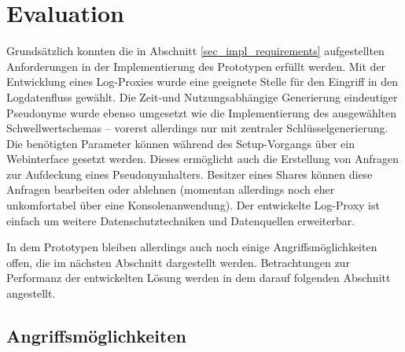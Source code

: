 \section{Evaluation}

\label{sec_impl_evaluation}


Grundsätzlich konnten die in Abschnitt \ref{sec_impl_requirements} aufgestellten Anforderungen in der Implementierung des Prototypen erfüllt werden. Mit der Entwicklung eines Log-Proxies wurde eine geeignete Stelle für den Eingriff in den Logdatenfluss gewählt. Die Zeit-und Nutzungsabhängige Generierung eindeutiger Pseudonyme wurde ebenso umgesetzt wie die Implementierung des ausgewählten Schwellwertschemas -- vorerst allerdings nur mit zentraler Schlüsselgenerierung. Die benötigten Parameter können während des Setup-Vorgangs über ein Webinterface gesetzt werden. Dieses ermöglicht auch die Erstellung von Anfragen zur Aufdeckung eines Pseudonymhalters. Besitzer eines Shares können diese Anfragen bearbeiten oder ablehnen (momentan allerdings noch eher unkomfortabel über eine Konsolenanwendung). Der entwickelte Log-Proxy ist einfach um weitere Datenschutztechniken und Datenquellen erweiterbar.

In dem Prototypen bleiben allerdings auch noch einige Angriffsmöglichkeiten offen, die im nächsten Abschnitt dargestellt werden. Betrachtungen zur Performanz der entwickelten Lösung werden in dem darauf folgenden Abschnitt angestellt.

\subsection{Angriffsmöglichkeiten}


